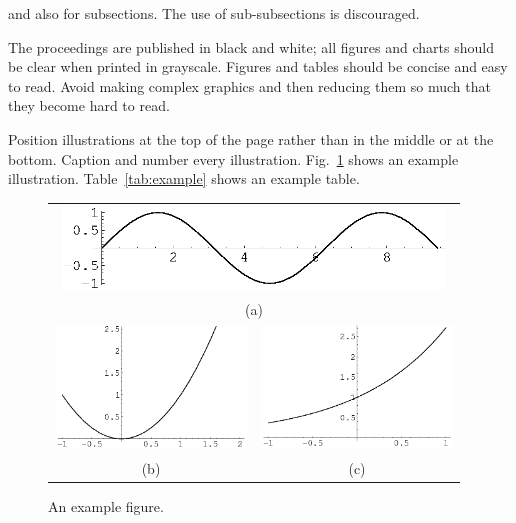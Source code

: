 \documentclass[smallabstract,smallcaptions]{dccpaper}
\begin{document}

and also for subsections. The use of sub-subsections is discouraged.


The proceedings are published in black and white; all figures and
charts should be clear when printed in grayscale. Figures and tables
should be concise and easy to read. Avoid making complex graphics and
then reducing them so much that they become hard to read.

Position illustrations at the top of the page rather than in the middle
or at the bottom. Caption and number every illustration.
Fig.~\ref{fig:example} shows an example illustration.
Table~\ref{tab:example} shows an example table.


\begin{figure}[t]
\begin{center}
\begin{tabular}{cc}
\multicolumn{2}{c}{\includegraphics[width=4in]{image1}} \\
\multicolumn{2}{c}{\small{(a)}} \\[1em]
\includegraphics[width=2in]{image3} &
\includegraphics[width=2in]{image4} \\
{\small (b)} & {\small (c)}
\end{tabular}
\end{center}
\caption{\label{fig:example}%
An example figure.}
\end{figure}
\end{document}
